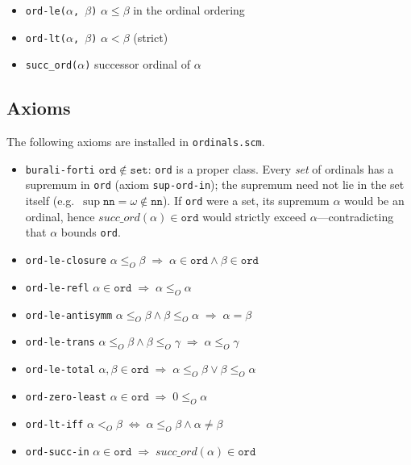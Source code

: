 \begin{itemize}
\item \texttt{ord-le($\alpha$, $\beta$)} \quad $\alpha \leq \beta$ in the ordinal ordering
\item \texttt{ord-lt($\alpha$, $\beta$)} \quad $\alpha < \beta$ (strict)
\item \texttt{succ\_ord($\alpha$)} \quad successor ordinal of $\alpha$
\end{itemize}

\subsection{Axioms}

The following axioms are installed in \texttt{ordinals.scm}.

\begin{itemize}
\item \texttt{burali-forti}
  $\mathtt{ord} \notin \mathtt{set}$: \texttt{ord} is a proper class.
  Every \emph{set} of ordinals has a supremum in \texttt{ord}
  (axiom \texttt{sup-ord-in}); the supremum need not lie in the set itself
  (e.g.\ $\sup \mathtt{nn} = \omega \notin \mathtt{nn}$).
  If \texttt{ord} were a set, its supremum $\alpha$ would be an ordinal,
  hence $\mathit{succ\_ord}(\alpha) \in \mathtt{ord}$ would strictly
  exceed $\alpha$---contradicting that $\alpha$ bounds \texttt{ord}.
\item \texttt{ord-le-closure}
  $\alpha \leq_O \beta \;\Rightarrow\; \alpha \in \mathtt{ord} \land \beta \in \mathtt{ord}$
\item \texttt{ord-le-refl}
  $\alpha \in \mathtt{ord} \;\Rightarrow\; \alpha \leq_O \alpha$
\item \texttt{ord-le-antisymm}
  $\alpha \leq_O \beta \land \beta \leq_O \alpha \;\Rightarrow\; \alpha = \beta$
\item \texttt{ord-le-trans}
  $\alpha \leq_O \beta \land \beta \leq_O \gamma \;\Rightarrow\; \alpha \leq_O \gamma$
\item \texttt{ord-le-total}
  $\alpha,\beta \in \mathtt{ord} \;\Rightarrow\; \alpha \leq_O \beta \lor \beta \leq_O \alpha$
\item \texttt{ord-zero-least}
  $\alpha \in \mathtt{ord} \;\Rightarrow\; 0 \leq_O \alpha$
\item \texttt{ord-lt-iff}
  $\alpha <_O \beta \;\Leftrightarrow\; \alpha \leq_O \beta \land \alpha \neq \beta$
\item \texttt{ord-succ-in}
  $\alpha \in \mathtt{ord} \;\Rightarrow\; \mathit{succ\_ord}(\alpha) \in \mathtt{ord}$

\end{itemize}
